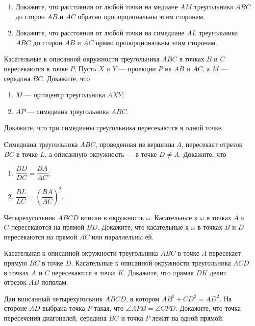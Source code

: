 \documentclass{article}
\begin{document}
\begin{enumerate_boxed}
        \item
        \begin{enumerate}
            \item Докажите, что расстояния от любой точки на медиане $ AM $ треугольника $ ABC $ до сторон $ AB $ и $ AC $ обратно пропорциональны этим сторонам.
            \item Докажите, что расстояния от любой точки на симедиане $ AL $ треугольника $ ABC $ до сторон $ AB $ и $ AC $ прямо пропорциональны этим сторонам.
        \end{enumerate}

        \item Касательные к описанной окружности треугольника $ ABC $ в точках $ B $ и $ C $ пересекаются в точке $ P $.
        Пусть $ X $ и $ Y $ — проекции $ P $ на $ AB $ и $ AC $, а $ M $ — середина $ BC $.
        Докажите, что

        \begin{enumerate}
            \item $ M $ — ортоцентр треугольника $ AXY $;
            \item $ AP $ — симедиана треугольника $ ABC $.
        \end{enumerate}

        \item Докажите, что три симедианы треугольника пересекаются в одной точке.
        \item Симедиана треугольника $ ABC $, проведенная из вершины $ A $, пересекает отрезок $ BC $ в точке $ L $, а описанную окружность — в точке $ D \neq A $.
        Докажите, что
        \begin{enumerate}
            \item $ \dfrac{BD}{DC} = \dfrac{BA}{AC}; $
            \item $ \dfrac{BL}{LC} = \left( \dfrac{BA}{AC}\right) ^2$.
        \end{enumerate}

        \item Четырехугольник $ ABCD $ вписан в окружность $\omega$.
        Касательные к $\omega$ в точках $ A $ и $ C $ пересекаются на прямой $ BD $.
        Докажите, что касательные к $\omega$ в точках $ B $ и $ D $ пересекаются на прямой $ AC $ или параллельны ей.
        \item Касательная к описанной окружности треугольника $ ABC $ в точке $ A $ пересекает прямую $ BC $ в точке $ D $.
        Касательные к описанной окружности треугольника $ ACD $ в точках $ A $ и $ C $ пересекаются в точке $ K $.
        Докажите, что прямая $ DK $ делит отрезок $ AB $ пополам.
        \item Дан вписанный четырехугольник $ ABCD $, в котором $AB^2 + CD^2 = AD^2 $.
        На стороне $ AD $ выбрана точка $ P $ такая, что $ \angle APB = \angle CPD $.
        Докажите, что точка пересечения диагоналей, середина $ BC $ и точка $ P $ лежат на одной прямой.


\end{enumerate_boxed}
\end{document}
